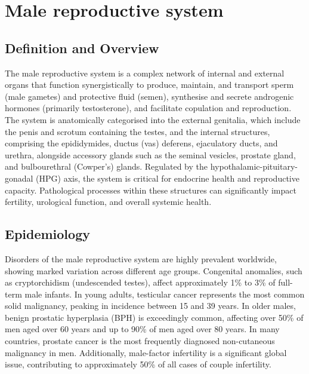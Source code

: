 \chapter{Male reproductive system}

\section*{Definition and Overview}
The male reproductive system is a complex network of internal and external organs that function synergistically to produce, maintain, and transport sperm (male gametes) and protective fluid (semen), synthesise and secrete androgenic hormones (primarily testosterone), and facilitate copulation and reproduction. The system is anatomically categorised into the external genitalia, which include the penis and scrotum containing the testes, and the internal structures, comprising the epididymides, ductus (vas) deferens, ejaculatory ducts, and urethra, alongside accessory glands such as the seminal vesicles, prostate gland, and bulbourethral (Cowper's) glands. Regulated by the hypothalamic-pituitary-gonadal (HPG) axis, the system is critical for endocrine health and reproductive capacity. Pathological processes within these structures can significantly impact fertility, urological function, and overall systemic health.

\section*{Epidemiology}
Disorders of the male reproductive system are highly prevalent worldwide, showing marked variation across different age groups. Congenital anomalies, such as cryptorchidism (undescended testes), affect approximately 1\% to 3\% of full-term male infants. In young adults, testicular cancer represents the most common solid malignancy, peaking in incidence between 15 and 39 years. In older males, benign prostatic hyperplasia (BPH) is exceedingly common, affecting over 50\% of men aged over 60 years and up to 90\% of men aged over 80 years. In many countries, prostate cancer is the most frequently diagnosed non-cutaneous malignancy in men. Additionally, male-factor infertility is a significant global issue, contributing to approximately 50\% of all cases of couple infertility.


